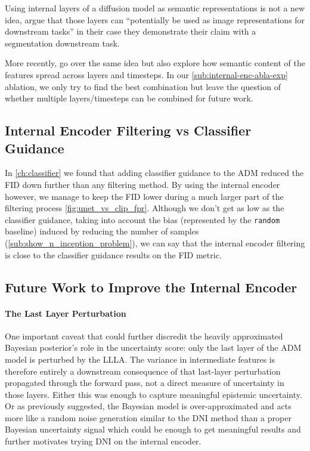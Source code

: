 Using internal layers of a diffusion model as semantic representations is not a new idea, \cite{baranchuk_label-efficient_2022} argue that those layers can ``potentially be used as image representations for downstream tasks'' in their case they demonstrate their claim with a segmentation downstream task. 

More recently, \cite{luo_diffusion_2024} go over the same idea but also explore how semantic content of the features spread across layers and timesteps. In our \autoref{sub:internal-enc-abla-exp} ablation, we only try to find the best combination but leave the question of whether multiple layers/timesteps can be combined for future work.

\subsection{Internal Encoder Filtering vs Classifier Guidance}

In \autoref{ch:classifier} we found that adding classifier guidance to the \acs{ADM} reduced the FID down further than any filtering method. 
By using the internal encoder however, we manage to keep the FID lower during a much larger part of the filtering process \autoref{fig:unet_vs_clip_fpr}. Although we don't get as low as the classifier guidance, taking into account the bias (represented by the \texttt{random} baseline) induced by reducing the number of samples (\autoref{sub:show_n_inception_problem}), we can say that the internal encoder filtering is close to the classifier guidance results on the \acs{FID} metric. 

\subsection{Future Work to Improve the Internal Encoder}


\paragraph{The Last Layer Perturbation}
One important caveat that could further discredit the heavily approximated Bayesian posterior's role in the uncertainty score: only the last layer of the \acs{ADM} model is perturbed by the
\acs{LLLA}. The variance in intermediate features is therefore entirely a downstream consequence of that last-layer perturbation propagated through the forward pass, not a direct measure of uncertainty in those layers. Either this was enough to capture meaningful epistemic uncertainty. Or as previously suggested, the Bayesian model is over-approximated and acts more like a random noise generation similar to the \acs{DNI} method than a proper Bayesian uncertainty signal which could be enough to get meaningful results and further motivates trying \acs{DNI} on the internal encoder.

